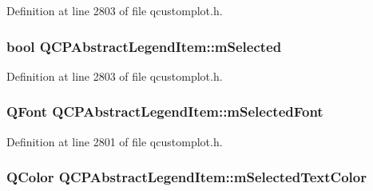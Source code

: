 Definition at line 2803 of file qcustomplot.\-h.

\hypertarget{class_q_c_p_abstract_legend_item_ae58ebebbd0c36cc6fe897483369984d2}{
\subsubsection[{m\-Selected}]{\setlength{\rightskip}{0pt plus 5cm}bool Q\-C\-P\-Abstract\-Legend\-Item\-::m\-Selected\hspace{0.3cm}{\ttfamily [protected]}}}\label{class_q_c_p_abstract_legend_item_ae58ebebbd0c36cc6fe897483369984d2}


Definition at line 2803 of file qcustomplot.\-h.

\hypertarget{class_q_c_p_abstract_legend_item_ab971df604306b192875a7d097feb1e21}{
\subsubsection[{m\-Selected\-Font}]{\setlength{\rightskip}{0pt plus 5cm}Q\-Font Q\-C\-P\-Abstract\-Legend\-Item\-::m\-Selected\-Font\hspace{0.3cm}{\ttfamily [protected]}}}\label{class_q_c_p_abstract_legend_item_ab971df604306b192875a7d097feb1e21}


Definition at line 2801 of file qcustomplot.\-h.

\hypertarget{class_q_c_p_abstract_legend_item_a4965c13854d970b24c284f0a4f005fbd}{
\subsubsection[{m\-Selected\-Text\-Color}]{\setlength{\rightskip}{0pt plus 5cm}Q\-Color Q\-C\-P\-Abstract\-Legend\-Item\-::m\-Selected\-Text\-Color\hspace{0.3cm}{\ttfamily [protected]}}}\label{class_q_c_p_abstract_legend_item_a4965c13854d970b24c284f0a4f005fbd}


